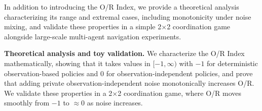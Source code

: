 


In addition to introducing the O/R Index, we provide a theoretical analysis
characterizing its range and extremal cases, including monotonicity under
noise mixing, and validate these properties in a simple 2$\times$2 coordination
game alongside large-scale multi-agent navigation experiments.






\item \textbf{Theoretical analysis and toy validation.}
We characterize the O/R Index mathematically, showing that it takes values
in $[-1,\infty)$ with $-1$ for deterministic observation-based policies and
$0$ for observation-independent policies, and prove that adding private
observation-independent noise monotonically increases O/R. We validate these
properties in a 2$\times$2 coordination game, where O/R moves smoothly from
$-1$ to $\approx 0$ as noise increases.




